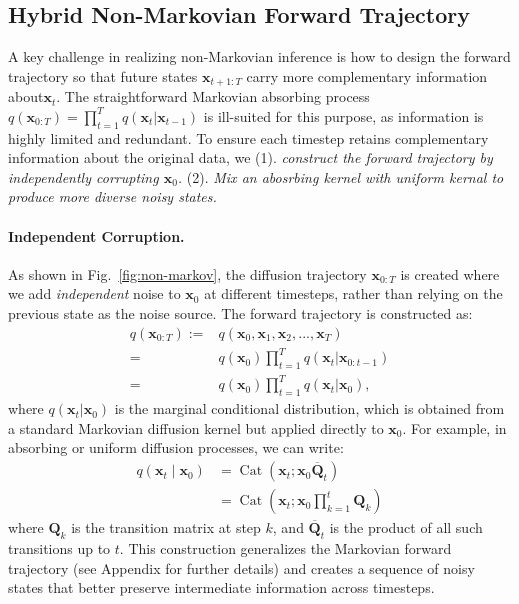


\subsection{Hybrid Non-Markovian Forward Trajectory}
A key challenge in realizing non-Markovian inference is how to design the forward trajectory so that future states \(\mathbf{x}_{t+1: T}\) carry more complementary information about\(\mathbf{x}_t\). The straightforward Markovian absorbing process \(q(\mathbf{x}_{0:T}) = \prod_{t=1}^{T} q(\mathbf{x}_t | \mathbf{x}_{t-1})\) is ill-suited for this purpose, as information is highly limited and redundant. To ensure each timestep retains complementary information about the original data, we (1). \textit{construct the forward trajectory by independently corrupting \(\mathbf{x}_0\).}
(2). \textit{Mix an abosrbing kernel with uniform kernal to produce more diverse noisy states.}

\paragraph{Independent Corruption.}
As shown in Fig.~\ref{fig:non-markov}, the diffusion trajectory \(\mathbf{x}_{0:T}\) is created  where we add \textit{independent} noise to \(\mathbf{x}_0\) at different timesteps, rather than relying on the previous state as the noise source. The forward trajectory is constructed as:
    \begin{align}
    q(\mathbf{x}_{0:T}) :=&  q(\mathbf{x}_0, \mathbf{x}_1, \mathbf{x}_2, ..., \mathbf{x}_T) \\
    =& q(\mathbf{x}_0) \prod_{t=1}^{T} q(\mathbf{x}_t | \mathbf{x}_{0:t-1}) \\
    =& q(\mathbf{x}_0) \prod_{t=1}^{T} q(\mathbf{x}_t | \mathbf{x}_{0}),
    \end{align} 
where \(q(\mathbf{x}_t | \mathbf{x}_{0})\) is the marginal conditional distribution, which is obtained from a standard Markovian diffusion kernel but applied directly to \(\mathbf{x}_0\). For example, in absorbing or uniform diffusion processes, we can write:
    \begin{align}
        q\left(\mathbf{x}_t \mid \mathbf{x}_0\right)&=\operatorname{Cat}\left(\mathbf{x}_t ; \mathbf{x}_0 \overline{\mathbf{Q}}_t\right) \\
        &= \operatorname{Cat}\left(\mathbf{x}_t ; \mathbf{x}_0 \prod_{k=1}^{t} \mathbf{Q}_k\right)
    \end{align}
    where \(\mathbf{Q}_k\) is the transition matrix at step \(k\), and \(\overline{\mathbf{Q}}_t\) is the product of all such transitions up to \(t\). This construction generalizes the Markovian forward trajectory (see Appendix for further details) and creates a sequence of noisy states that better preserve intermediate information across timesteps.

